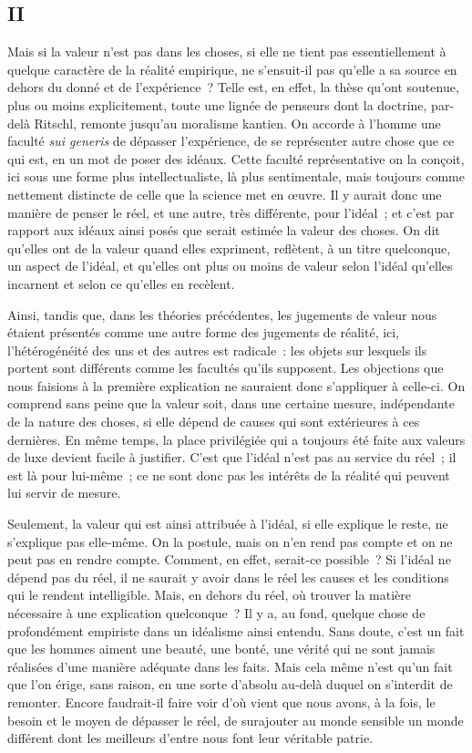\documentclass[french,twoside]{book} %
\begin{document}
\subsection[{II}]{II}
\noindent Mais si la valeur n’est pas dans les choses, si elle ne tient pas essentiellement à quelque caractère de la réalité empirique, ne s’ensuit-il pas qu’elle a sa source en dehors du donné et de l’expérience ? Telle est, en effet, la thèse qu’ont soutenue, plus ou moins explicitement, toute une lignée de penseurs dont la doctrine, par-delà Ritschl, remonte jusqu’au moralisme kantien. On accorde à l’homme une faculté {\itshape sui generis} de dépasser l’expérience, de se représenter autre chose que ce qui est, en un mot de poser des idéaux. Cette faculté représentative on la conçoit, ici sous une forme plus intellectualiste, là plus sentimentale, mais toujours comme nettement distincte de celle que la science met en œuvre. Il y aurait donc une manière de penser le réel, et une autre, très différente, pour l’idéal ; et c’est par rapport aux idéaux ainsi posés que serait estimée la valeur des choses. On dit qu’elles ont de la valeur quand elles expriment, reflètent, à un titre quelconque, un aspect de l’idéal, et qu’elles ont plus ou moins de valeur selon l’idéal qu’elles incarnent et selon ce qu’elles en recèlent.\par
\par
Ainsi, tandis que, dans les théories précédentes, les jugements de valeur nous étaient présentés comme une autre forme des jugements de réalité, ici, l’hétérogénéité des uns et des autres est radicale : les objets sur lesquels ils portent sont différents comme les facultés qu’ils supposent. Les objections que nous faisions à la première explication ne sauraient donc s’appliquer à celle-ci. On comprend sans peine que la valeur soit, dans une certaine mesure, indépendante de la nature des choses, si elle dépend de causes qui sont extérieures à ces dernières. En même temps, la place privilégiée qui a toujours été faite aux valeurs de luxe devient facile à justifier. C’est que l’idéal n’est pas au service du réel ; il est là pour lui-même ; ce ne sont donc pas les intérêts de la réalité qui peuvent lui servir de mesure.\par
Seulement, la valeur qui est ainsi attribuée à l’idéal, si elle explique le reste, ne s’explique pas elle-même. On la postule, mais on n’en rend pas compte et on ne peut pas en rendre compte. Comment, en effet, serait-ce possible ? Si l’idéal ne dépend pas du réel, il ne saurait y avoir dans le réel les causes et les conditions qui le rendent intelligible. Mais, en dehors du réel, où trouver la matière nécessaire à une explication quelconque ? Il y a, au fond, quelque chose de profondément empiriste dans un idéalisme ainsi entendu. Sans doute, c’est un fait que les hommes aiment une beauté, une bonté, une vérité qui ne sont jamais réalisées d’une manière adéquate dans les faits. Mais cela même n’est qu’un fait que l’on érige, sans raison, en une sorte d’absolu au-delà duquel on s’interdit de remonter. Encore faudrait-il faire voir d’où vient que nous avons, à la fois, le besoin et le moyen de dépasser le réel, de surajouter au monde sensible un monde différent dont les meilleurs d’entre nous font leur véritable patrie.\par
\end{document}
